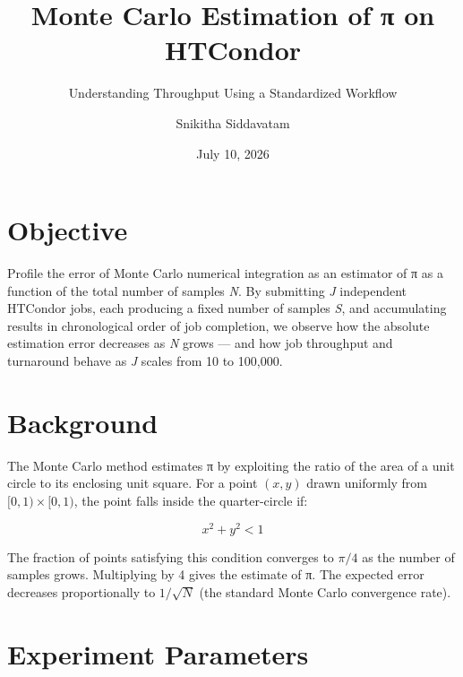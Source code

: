 \documentclass[
]{article}
\title{Monte Carlo Estimation of π on HTCondor}
\subtitle{Understanding Throughput Using a Standardized Workflow}
\author{Snikitha Siddavatam}
\date{July 10, 2026}
\begin{document}
\maketitle

{
\setcounter{tocdepth}{3}
\tableofcontents
}
\section{Objective}\label{objective}

Profile the error of Monte Carlo numerical integration as an estimator
of π as a function of the total number of samples \emph{N}. By
submitting \emph{J} independent HTCondor jobs, each producing a fixed
number of samples \emph{S}, and accumulating results in chronological
order of job completion, we observe how the absolute estimation error
decreases as \emph{N} grows --- and how job throughput and turnaround
behave as \emph{J} scales from 10 to 100,000.

\section{Background}\label{background}

The Monte Carlo method estimates π by exploiting the ratio of the area
of a unit circle to its enclosing unit square. For a point \((x, y)\)
drawn uniformly from \([0,1) \times [0,1)\), the point falls inside the
quarter-circle if:

\[x^2 + y^2 < 1\]

The fraction of points satisfying this condition converges to \(\pi/4\)
as the number of samples grows. Multiplying by 4 gives the estimate of
π. The expected error decreases proportionally to \(1/\sqrt{N}\) (the
standard Monte Carlo convergence rate).

\section{Experiment Parameters}\label{experiment-parameters}
\end{document}
